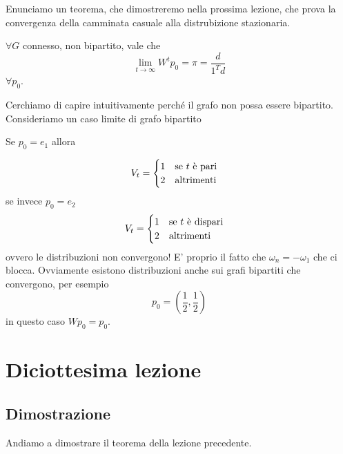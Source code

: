 \documentclass[12pt]{report}
\begin{document}
\noindent 
Enunciamo un teorema, che dimostreremo nella prossima lezione, che prova la convergenza della camminata casuale alla distrubizione stazionaria.

\begin{teo}
    $\forall G$ connesso, non bipartito,  vale che 
    $$\lim_{t\rightarrow \infty} W^t p_0 = \pi = \frac{d}{1^T d}$$
    $\forall p_0$.
\end{teo}
Cerchiamo di capire intuitivamente perché il grafo non possa essere bipartito.  Consideriamo un caso limite di grafo bipartito

Se $p_0 = e_1$ allora

$$V_t = \begin{cases}
    1 \hspace{10px} \text{se $t$ è pari} \\
    2 \hspace{10px} \text{altrimenti} 
\end{cases}$$
se invece $p_0 = e_2$
$$V_t = \begin{cases}
    1 \hspace{10px} \text{se $t$ è dispari} \\
    2 \hspace{10px} \text{altrimenti} 
\end{cases}$$
ovvero le distribuzioni non convergono! E' proprio il fatto che $\omega_n = - \omega_1$ che ci blocca. Ovviamente esistono distribuzioni anche sui grafi bipartiti che convergono, per esempio 
$$p_0=(\frac{1}{2},\frac{1}{2})$$
in questo caso $Wp_0 = p_0$.

\chapter{Diciottesima lezione}

\section{Dimostrazione}

\noindent 
Andiamo a dimostrare il teorema della lezione precedente. 
\end{document}
